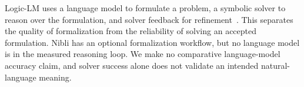 Logic-LM uses a language model to formulate a problem, a symbolic solver to
reason over the formulation, and solver feedback for refinement~\cite{logic-lm}.
This separates the quality of formalization from the reliability of solving an
accepted formulation. Nibli has an optional formalization workflow, but no
language model is in the measured reasoning loop. We make no comparative
language-model accuracy claim, and solver success alone does not validate an
intended natural-language meaning.
